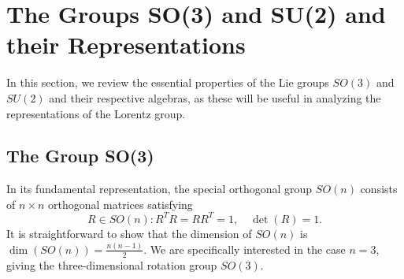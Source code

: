 \section{The Groups SO(3) and SU(2) and their Representations}

In this section, we review the essential properties of the Lie groups $SO(3)$ and $SU(2)$ and their respective algebras, as these will be useful in analyzing the representations of the Lorentz group.

\subsection{The Group SO(3)}

In its fundamental representation, the special orthogonal group $SO(n)$ consists of $n \times n$ orthogonal matrices satisfying
\[
R \in SO(n) : R^T R = R R^T = 1, \quad \det(R) = 1.
\]
It is straightforward to show that the dimension of $SO(n)$ is $\dim(SO(n)) = \frac{n(n-1)}{2}$. We are specifically interested in the case $n = 3$, giving the three-dimensional rotation group $SO(3)$.

